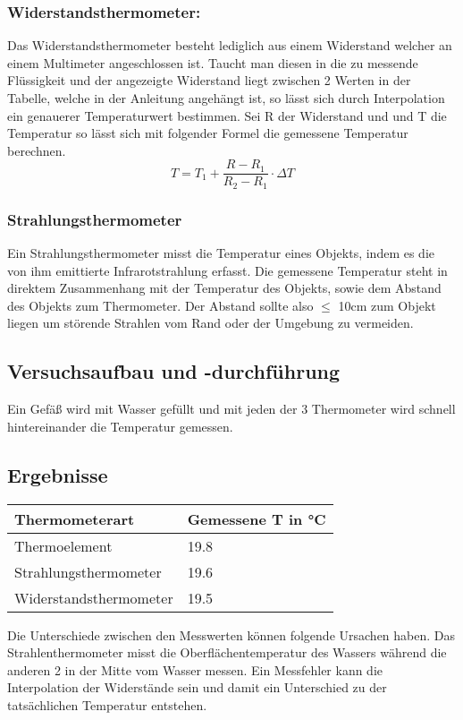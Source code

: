    \subsubsection*{Widerstandsthermometer:}
   Das Widerstandsthermometer besteht lediglich aus einem Widerstand welcher an einem Multimeter angeschlossen ist. Taucht man diesen in die zu messende Flüssigkeit und der angezeigte Widerstand liegt zwischen 2 Werten in der Tabelle, welche in der Anleitung angehängt ist, so lässt sich durch Interpolation ein genauerer Temperaturwert bestimmen. Sei R der Widerstand und und T die Temperatur so lässt sich mit folgender Formel die gemessene Temperatur berechnen.
   $$T = T_{1} + \frac{R - R_{1}}{R_{2} - R_{1}} \cdot \Delta T$$
   \subsubsection*{Strahlungsthermometer}
   Ein Strahlungsthermometer misst die Temperatur eines Objekts, indem es die von ihm emittierte Infrarotstrahlung erfasst. Die gemessene Temperatur steht in direktem Zusammenhang mit der Temperatur des Objekts, sowie dem Abstand des Objekts zum Thermometer.  Der Abstand sollte also $\leq$ 10cm zum Objekt liegen um störende Strahlen vom Rand oder der Umgebung zu vermeiden. 
    \subsection{Versuchsaufbau und -durchführung}
	Ein Gefäß wird mit Wasser gefüllt und mit jeden der 3 Thermometer wird schnell hintereinander die Temperatur gemessen.
    \subsection{Ergebnisse}
      
	      \begin{table}[H]
		\centering
		\begin{tabular}{|l|l|}
			\hline
			Thermometerart & Gemessene T in °C\\
			\hline
			Thermoelement& 19.8 \\
			\hline
			Strahlungsthermometer & 19.6 \\
			\hline
			Widerstandsthermometer& 19.5 \\
			\hline
		\end{tabular}
	\end{table}
	Die Unterschiede zwischen den Messwerten können folgende Ursachen haben. Das Strahlenthermometer misst die Oberflächentemperatur des Wassers während die anderen 2 in der Mitte vom Wasser messen. Ein Messfehler kann die Interpolation der Widerstände sein und damit ein Unterschied zu der tatsächlichen Temperatur entstehen.
